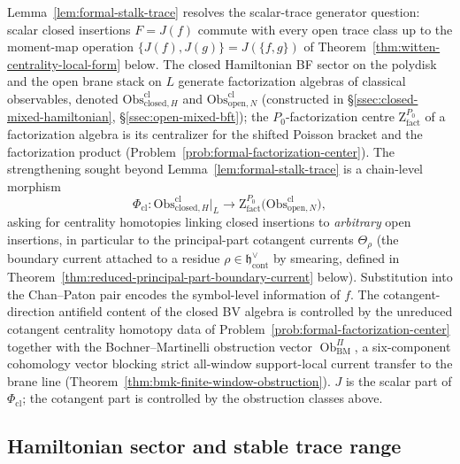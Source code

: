 \documentclass[11pt]{memoir}
\begin{document}
\begin{rmk}\label{rmk:formal-stalk-obstruction}
  Lemma~\ref{lem:formal-stalk-trace} resolves the scalar-trace
  generator question: scalar closed insertions \(F=J(f)\) commute with
  every open trace class up to the moment-map operation
  \(\{J(f),J(g)\}=J(\{f,g\})\) of
  Theorem~\ref{thm:witten-centrality-local-form} below.  The closed
  Hamiltonian BF sector on the polydisk and the open brane stack on
  \(L\) generate factorization algebras of classical observables,
  denoted \(\mathrm{Obs}^{\mathrm{cl}}_{\mathrm{closed},H}\) and
  \(\mathrm{Obs}^{\mathrm{cl}}_{\mathrm{open},N}\) (constructed in
  \S\ref{ssec:closed-mixed-hamiltonian},
  \S\ref{ssec:open-mixed-bft}); the \(P_0\)-factorization centre
  \(\mathrm Z^{P_0}_{\mathrm{fact}}\) of a factorization algebra is its
  centralizer for the shifted Poisson bracket and the factorization
  product (Problem~\ref{prob:formal-factorization-center}).  The
  strengthening sought beyond Lemma~\ref{lem:formal-stalk-trace}
  is a chain-level morphism
  \[
    \Phi_{\mathrm{cl}}\colon
    \mathrm{Obs}^{\mathrm{cl}}_{\mathrm{closed},H}\big|_L
    \longrightarrow
    \mathrm Z^{P_0}_{\mathrm{fact}}\!\bigl(\mathrm{Obs}^{\mathrm{cl}}_{\mathrm{open},N}\bigr),
  \]
  asking for centrality homotopies linking closed insertions to
  \emph{arbitrary} open insertions, in particular to the principal-part
  cotangent currents \(\Theta_\rho\) (the boundary current attached to
  a residue \(\rho\in\mathfrak h^\vee_{\mathrm{cont}}\) by smearing,
  defined in Theorem~\ref{thm:reduced-principal-part-boundary-current}
  below).  Substitution into the Chan--Paton pair encodes the
  symbol-level information of \(f\).  The cotangent-direction
  antifield content of the closed BV algebra is controlled by the unreduced
  cotangent centrality homotopy data of
  Problem~\ref{prob:formal-factorization-center} together with the
  Bochner--Martinelli obstruction vector
  \(\operatorname{Ob}^{\Pi}_{\mathrm{BM}}\), a six-component
  cohomology vector blocking strict all-window support-local current
  transfer to the brane line
  (Theorem~\ref{thm:bmk-finite-window-obstruction}).  \(J\) is the scalar
  part of \(\Phi_{\mathrm{cl}}\); the cotangent part is controlled by
  the obstruction classes above.
\end{rmk}

\subsection{Hamiltonian sector and stable trace range}
\end{document}
